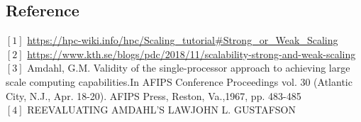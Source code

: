 \documentclass[pstricks,border=14pt,14pt]{article}
\begin{document}
\subsection*{Reference}
$[1]$ \url{https://hpc-wiki.info/hpc/Scaling_tutorial#Strong_or_Weak_Scaling} \\
$[2]$ \url{https://www.kth.se/blogs/pdc/2018/11/scalability-strong-and-weak-scaling} \\
$[3]$ Amdahl, G.M. Validity of the single-processor approach to achieving large scale computing capabilities.In AFIPS Conference Proceedings vol. 30 (Atlantic City, N.J., Apr. 18-20). AFIPS Press, Reston, Va.,1967, pp. 483-485 \\
$[4]$ REEVALUATING AMDAHL'S LAWJOHN L. GUSTAFSON \\
\end{document}
